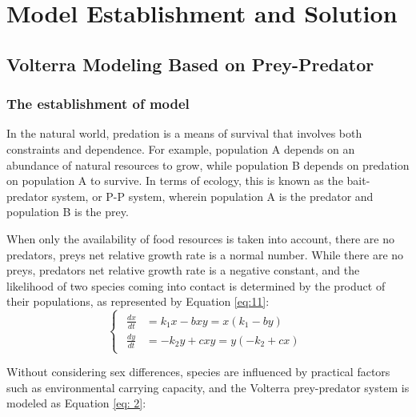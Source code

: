 \documentclass[12pt]{article}  %
\begin{document}
\section{Model Establishment and Solution}
\subsection{%
Volterra Modeling Based on  Prey-Predator}


\subsubsection{The establishment of model}
In the natural world, predation is a means of survival that involves both constraints and dependence. For example, population A depends on an abundance of natural resources to grow, while population B depends on predation on population A to survive. In terms of ecology, this is known as the bait-predator system, or P-P system, wherein population A is the predator and population B is the prey.\par
When only the availability of food resources is taken into account, there are no predators, preys net relative growth rate is a normal number. While there are no preys, predators net relative growth rate is a negative constant, and the likelihood of two species coming into contact is determined by the product of their populations, as represented by Equation \ref{eq:11}:
\begin{equation}
	\begin{cases}
		\begin{aligned}
			\frac{dx}{dt} &= k_{1}x - bxy = x(k_{1} - by) \\
			\frac{dy}{dt} &= -k_{2}y + cxy = y(-k_{2} + cx)
		\end{aligned}
		\label{eq:11}
	\end{cases}
\end{equation}
\par
Without considering sex differences, species are influenced by practical factors such as environmental carrying capacity, and the Volterra prey-predator system is modeled as Equation \ref{eq: 2}:
\end{document}
